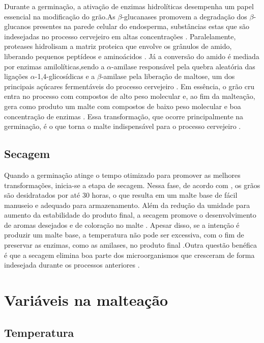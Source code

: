 Durante a germinação, a ativação de enzimas hidrolíticas desempenha um papel essencial na modificação do grão.As $\beta$-glucanases promovem a degradação dos $\beta$-glucanos presentes na parede celular do endosperma, substâncias estas que são indesejadas no processo cervejeiro em altas concentrações \cite{LEWIS2012}. Paralelamente, proteases hidrolisam a matriz proteica que envolve os grânulos de amido, liberando pequenos peptídeos e aminoácidos \cite{FOX2009,GUPTA2010}. Já a conversão do amido é mediada por enzimas amilolíticas,sendo a $\alpha$-amilase responsável pela quebra aleatória das ligações $\alpha$-1,4-glicosídicas e a $\beta$-amilase pela liberação de maltose, um dos principais açúcares fermentáveis do processo cervejeiro \cite{GUPTA2010,MALLETT2022}. Em essência, o grão cru entra no processo com compostos de alto peso molecular e, ao fim da malteação, gera como produto um malte com compostos de baixo peso molecular e boa concentração de enzimas \cite{KUNZE1996}. Essa transformação, que ocorre principalmente na germinação, é o que torna o malte indispensável para o processo cervejeiro \cite{CENCI2021}.

\subsection{Secagem}

Quando a germinação atinge o tempo otimizado para promover as melhores transformações, inicia-se a etapa de secagem. Nessa fase, de acordo com , os grãos são desidratados por até 30 horas, o que resulta em um malte base de fácil manuseio e adequado para armazenamento. Além da redução da umidade para aumento da estabilidade do produto final, a secagem promove o desenvolvimento de aromas desejados e de coloração no malte \cite{BAMFORTH2003}. Apesar disso, se a intenção é produzir um malte base, a temperatura não pode ser excessiva, com o fim de preservar as enzimas, como as amilases, no produto final \cite{LEWIS2012}.Outra questão benéfica é que a secagem elimina boa parte dos microorganismos que cresceram de forma indesejada durante os processos anteriores \cite{DOUGLAS1988, PETTERS1988}. 



\section{Variáveis na malteação}

\subsection{Temperatura}

